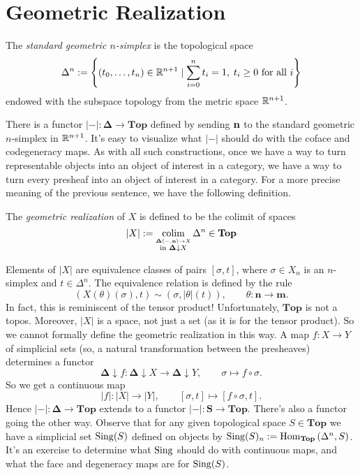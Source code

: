 \section{Geometric Realization}

\begin{definition}
\label{def:standard geometric n-simplex}
The \emph{standard geometric $n$-simplex} is the topological space
\[ \Delta^n := \left\{ (t_0,\ldots,t_n) \in \mathbb{R}^{n+1} \mid \sum_{i=0}^n t_i = 1,\; t_i \geq 0 \text{ for all } i \right\} \]
endowed with the subspace topology from the metric space $\mathbb{R}^{n+1}$.
\end{definition}
There is a functor $|-| : \mathbf{\Delta} \to \mathbf{Top}$ defined by sending $\bf{n}$ to the standard geometric $n$-simplex in $\mathbb{R}^{n+1}$. It's easy to visualize what $|-|$ should do with the coface and codegeneracy maps.
As with all such constructions, once we have a way to turn representable objects into an object of interest in a category, we have a way to turn every presheaf into an object of interest in a category. For a more precise meaning of the previous sentence, we have the following definition.
\begin{definition}
\label{def:geometric realization of a simplicial set}
The \emph{geometric realization} of $X$ is defined to be the colimit of spaces
\[ |X| := \operatorname*{colim}_{\stackrel{\mathbf{\Delta}(-,\mathbf{n}) \to X}{\text{in } \mathbf{\Delta}\downarrow X}} \Delta^n \in \mathbf{Top} \]
\end{definition}
Elements of $|X|$ are equivalence classes of pairs $[\sigma, t]$, where $\sigma \in X_n$ is an $n$-simplex and $t \in \Delta^n$. The equivalence relation is defined by the rule
\[ \left(X(\theta)(\sigma), t \right) \sim \left( \sigma, |\theta|(t) \right), \qquad \theta : \mathbf{n} \to \mathbf{m}. \]
In fact, this is reminiscent of the tensor product! Unfortunately, $\mathbf{Top}$ is not a topos. Moreover, $|X|$ is a space, not just a set (as it is for the tensor product). So we cannot formally define the geometric realization in this way.
A map $f : X \to Y$ of simplicial sets (so, a natural transformation between the presheaves) determines a functor
\[ \mathbf{\Delta} \downarrow f : \mathbf{\Delta} \downarrow X \to \mathbf{\Delta} \downarrow Y, \qquad \sigma \mapsto f \circ \sigma. \]
So we get a continuous map
\[ |f| : |X| \to |Y|, \qquad [\sigma,t] \mapsto [f \circ \sigma, t]. \]
Hence $|-| : \mathbf{\Delta} \to \mathbf{Top}$ extends to a functor $|-| : \mathbf{S} \to \mathbf{Top}$. There's also a functor going the other way. Observe that for any given topological space $S \in \mathbf{Top}$ we have a simplicial set $\operatorname{Sing}(S)$ defined on objects by $\operatorname{Sing}(S)_n := \operatorname{Hom}_{\mathbf{Top}}\left(\Delta^n, S\right)$. It's an exercise to determine what $\operatorname{Sing}$ should do with continuous maps, and what the face and degeneracy maps are for $\operatorname{Sing}(S)$.

